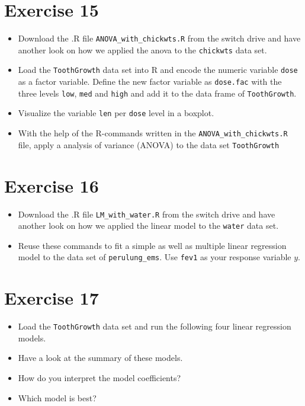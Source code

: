 \documentclass[11pt]{article}\usepackage[]{graphicx}\usepackage[]{color}
\begin{document}
\section*{Exercise 15}
\begin{itemize}
\item Download the .R file \texttt{ANOVA\_with\_chickwts.R} from the switch drive
and have another look on how we applied the anova to the \texttt{chickwts}
data set.
\item Load the \texttt{ToothGrowth} data set into R and encode the numeric variable
\texttt{dose} as a factor variable. Define the new factor variable as
\texttt{dose.fac} with the three levels \texttt{low}, \texttt{med} and
\texttt{high} and add it to the data frame of \texttt{ToothGrowth}.

\item Visualize the variable \texttt{len} per \texttt{dose} level in a boxplot.

\item With the help of the R-commands written in the
\texttt{ANOVA\_with\_chickwts.R}  file, apply a analysis of variance (ANOVA) to
the data set \texttt{ToothGrowth}

\end{itemize}

\section*{Exercise 16}
\begin{itemize}
\item Download the .R file \texttt{LM\_with\_water.R} from the switch drive
and have another look on how we applied the linear model to the \texttt{water}
data set.
\item Reuse these commands to fit a simple as well as multiple linear regression
model to the data set of \texttt{perulung\_ems}. Use \texttt{fev1} as your
response variable $y$.

\end{itemize}

\section*{Exercise 17}
\begin{itemize}
\item Load the \texttt{ToothGrowth} data set and run the following four
linear regression models.



\item Have a look at the summary of these models.

\item How do you interpret the model coefficients?
\item Which model is best?

\end{itemize}
\end{document}
